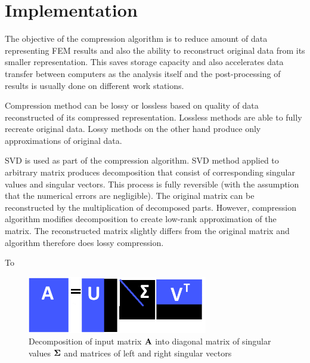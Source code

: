 \section{Implementation}
\label{section:implementation}


The objective of the compression algorithm is to reduce amount of data representing FEM results and also the ability to reconstruct original data from its smaller representation. This saves storage capacity and also accelerates data transfer between computers as the analysis itself and the post-processing of results is usually done on different work stations.

Compression method can be lossy or lossless based on quality of data reconstructed of its compressed representation. Lossless methods are able to fully recreate original data. Lossy methods on the other hand produce only approximations of original data. 

SVD is used as part of the compression algorithm. SVD method applied to arbitrary matrix produces decomposition that consist of corresponding singular values and singular vectors. This process is fully reversible (with the assumption that the numerical errors are negligible). The original matrix can be reconstructed by the multiplication of decomposed parts. However, compression algorithm modifies decomposition to create low-rank approximation of the matrix. The reconstructed matrix slightly differs from the original matrix and algorithm therefore does lossy compression.

To 




\begin{figure}[ht]
\centering\includegraphics[width=0.7\textwidth]{figures/low_rank_decomposition_diagram}
\caption{Decomposition of input matrix $\mathbf{A}$ into diagonal matrix of singular values $\mathbf{\Sigma}$ and matrices of left and right singular vectors}
\label{fig:lowrank_svd}
\end{figure}

